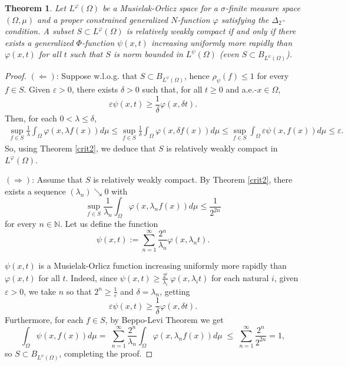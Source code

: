\documentclass[11pt,a4paper]{amsart}
\newtheorem{teorema}[definicion]{Theorem}
\newcommand{\lphi}{{L^{\varphi}(\Omega)}}
\newcommand\boldred[1]{\textcolor{red}{\textbf{#1}}}
\begin{document}
\begin{teorema}\label{Th.M-O}
Let $\lphi$ be a Musielak-Orlicz space for a $\sigma$-finite measure space $(\Omega,\mu)$ and a proper constrained generalized $N$-function $\varphi$ satisfying the $\Delta_2$-condition. A subset $S\subset\lphi$ is relatively weakly compact if and only if there exists a generalized $\Phi$-function $\psi(x,t)$ increasing uniformly more rapidly than $\varphi(x,t)$ for all $t$ such that $S$ is norm bounded in $L^{\psi}(\Omega)$ (even $S\subset B_{L^{\psi}(\Omega)}$).
\end{teorema}
\begin{proof}
$(\Leftarrow)$: Suppose w.l.o.g. that $S\subset B_{L^{\psi}(\Omega)}$, hence $\rho_{\psi}(f)\leq 1$ for every $f\in S$. %
Given $\varepsilon>0$, there exists $\delta>0$ such that, for all $t\geq 0$ and a.e.-$x\in\Omega$,
$$
\varepsilon\psi(x,t) \geq  \frac{1}{\delta}\varphi(x,\delta t).
$$
Then, for each $0<\lambda\leq \delta$,
\begin{align*}
\sup_{f\in S} \frac{1}{\lambda}\int_{\Omega} \varphi(x,\lambda f(x))d\mu
\leq \sup_{f\in S} \frac{1}{\delta}\int_{\Omega} \varphi(x,\delta f(x)) d\mu
\leq \sup_{f\in S}\int_{\Omega} \varepsilon\psi(x,f(x))d\mu
\leq{} \varepsilon.
\end{align*}
So, using Theorem \ref{crit2}, we deduce that $S$ is relatively weakly compact in $\lphi$.

$(\Rightarrow)$:
Assume that $S$ is relatively weakly compact. By Theorem \ref{crit2}, there exists a sequence $(\lambda_n)\searrow 0$ with
\begin{equation}\label{}
\sup_{f\in S}\frac{1}{\lambda_n}\int_{\Omega} \varphi(x, \lambda_n f(x)) d\mu \leq  \frac{1}{2^{2n}}
\end{equation}
for every $n\in\mathbb{N}$. Let us define the function
$$
\psi(x,t):=\sum_{n=1}^{\infty} \frac{2^n}{\lambda_n}\varphi(x, \lambda_n t).
$$

$\psi(x,t)$ is a Musielak-Orlicz function increasing uniformly more rapidly than $\varphi(x,t)$ for all $t$. Indeed, since $\psi(x,t)\geq \frac{2^i}{\lambda_i}\ \varphi(x,\lambda_i t)$ for each natural $i$, given $\varepsilon>0$, we take $n$ so that  $2^n\geq \frac{1}{\varepsilon}$ and $\delta=\lambda_n$, getting
$$\varepsilon\psi(x,t)\geq \frac{1}{\delta} \varphi(x,\delta t).$$
Furthermore, for each $f\in S$, by Beppo-Levi Theorem we get
$$
\int_{\Omega} \psi(x,f(x))d\mu
=\;  \sum_{n=1}^{\infty}\frac{2^n}{\lambda_n}\int_{\Omega} \varphi(x, \lambda_n f(x)) d\mu \;
\leq\;  \sum_{n=1}^{\infty} \frac{2^n}{2^{2n}}
= 1,
$$
so $S\subset B_{L^{\psi}(\Omega)}$, completing the proof.

\end{proof}
\end{document}
